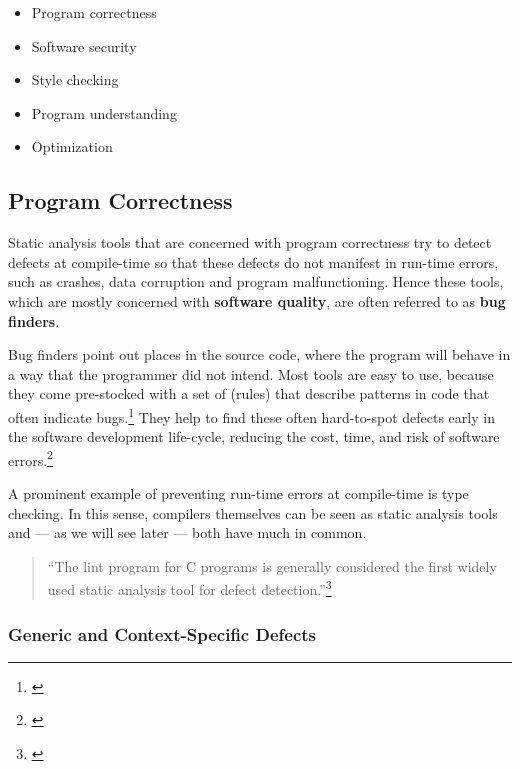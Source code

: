 \vspace{-5pt}
\begin{itemize}\addtolength{\itemsep}{-0.5\baselineskip}
\item Program correctness
\item Software security
\item Style checking
\item Program understanding
\item Optimization
\end{itemize}

\subsection{Program Correctness}

Static analysis tools that are concerned with program correctness try to detect \linebreak defects at compile-time so that these defects do not manifest in run-time errors, such as crashes, data corruption and program malfunctioning. Hence these tools, which are mostly concerned with \textbf{software quality}, are often referred to as \textbf{bug finders}.

Bug finders point out places in the source code, where the program will behave in a way that the programmer did not intend. Most tools are easy to use, because they come pre-stocked with a set of  (rules) that describe patterns in code that often indicate bugs.\footnote{\citep[32]{SecureProgramming}} They help to find these often hard-to-spot defects early in the software development life-cycle, reducing the cost, time, and risk of software errors.\footnote{\citep{CovertySA}}

A prominent example of preventing run-time errors at compile-time is type checking. In this sense, compilers themselves can be seen as static analysis tools and --- as we will see later --- both have much in common.

\begin{quotation}
``The lint program for C programs is generally considered the first widely used static analysis tool for defect detection.''\footnote{\citep[1]{UsingSAToFindBugs}}
\end{quotation}

\subsubsection{Generic and Context-Specific Defects}

